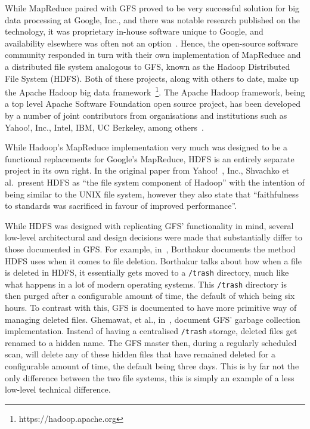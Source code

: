 \documentclass[a4paper,11pt]{article}
\begin{document}
While MapReduce paired with GFS proved to be very successful solution for big data processing at Google, Inc., and
there was notable research published on the technology, it was proprietary in-house software unique to Google, and
availability elsewhere was often not an option~\cite{grossman2009varieties}. Hence, the open-source software community
responded in turn with their own implementation of MapReduce and a distributed file system analogous to GFS, known as the
Hadoop Distributed File System (HDFS). Both of these projects, along with others to date, make up the Apache Hadoop
big data framework~\footnote{https://hadoop.apache.org}. The Apache Hadoop framework, being a top level Apache Software
Foundation open source project, has been developed by a number of joint contributors from organisations and institutions
such as Yahoo!, Inc., Intel, IBM, UC Berkeley, among others~\cite{hadoop_committers}.

While Hadoop's MapReduce implementation very much was designed to be a functional replacements for Google's MapReduce,
HDFS is an entirely separate project in its own right. In the original paper from Yahoo!~\cite{shvachko2010hadoop},
Inc., Shvachko et al.\ present HDFS as ``the file system component of Hadoop'' with the intention of being similar to
the UNIX file system, however they also state that ``faithfulness to standards was sacrificed in favour of improved
performance''.

While HDFS was designed with replicating GFS' functionality in mind, several low-level architectural and design decisions
were made that substantially differ to those documented in GFS. For example, in~\cite{borthakur2007hadoop}, Borthakur
documents the method HDFS uses when it comes to file deletion. Borthakur talks about how when a file is deleted in HDFS,
it essentially gets moved to a \texttt{/trash} directory, much like what happens in a lot of modern operating systems.
This \texttt{/trash} directory is then purged after a configurable amount of time, the default of which being six hours.
To contrast with this, GFS is documented to have more primitive way of managing deleted files. Ghemawat, et al.,
in~\cite{ghemawat_google_2003}, document GFS' garbage collection implementation. Instead of having a centralised
\texttt{/trash} storage, deleted files get renamed to a hidden name. The GFS master then, during a regularly scheduled
scan, will delete any of these hidden files that have remained deleted for a configurable amount of time, the default
being three days. This is by far not the only difference between the two file systems, this is simply an example of a
less low-level technical difference.
\end{document}
